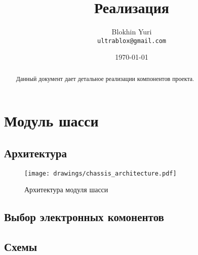 \documentclass[utf8]{report}
\begin{document}
\title{Реализация}
\author{Blokhin Yuri\\
        \texttt{ultrablox@gmail.com}}
\date{\today}
\maketitle
 
\tableofcontents

\begin{abstract}
Данный документ дает детальное реализации компонентов проекта.
\end{abstract}

\chapter{Модуль шасси}

\section{Архитектура}


\begin{figure}
    \centering
    \texttt{[image: drawings/chassis\_architecture.pdf]}
    \caption{Архитектура модуля шасси}
    \label{fig:hashset}
\end{figure}

\section{Выбор электронных комонентов}

\section{Схемы}

\begin{thebibliography}{9}

\end{thebibliography}
 
\end{document}
